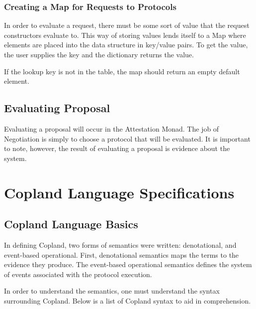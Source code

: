 \documentclass[10pt]{report}
\begin{document}
\subsection{Creating a Map for Requests to Protocols}
  
In order to evaluate a request, there must be some sort of value that
the request constructors evaluate to. This way of storing values lends
itself to a Map where elements are placed into the data structure in
key/value pairs. To get the value, the user supplies the key and the
dictionary returns the value.

If the lookup key is not in the table, the map should return an empty
default element. 
  
\section{Evaluating Proposal}

Evaluating a proposal will occur in the Attestation Monad. The job of
Negotiation is simply to choose a protocol that will be evaluated. It is
important to note, however, the result of evaluating a proposal is evidence
about the system. 

\chapter{Copland Language Specifications}

\section{Copland Language Basics}

In defining Copland, two forms of semantics were written: 
denotational, and event-based operational. First, denotational 
semantics maps the terms to the evidence they produce. 
The event-based operational semantics defines the system 
of events associated with the protocol execution. 

In order to understand the semantics, one must understand 
the syntax surrounding Copland. Below is a list of Copland 
syntax to aid in comprehension. 
\end{document}
